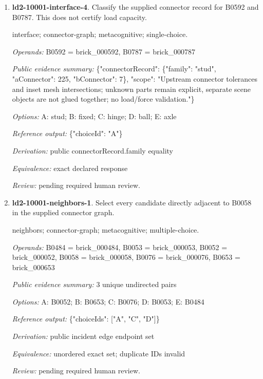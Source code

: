 \begin{enumerate}
\par{\small interface; connector-graph; metacognitive; single-choice.\par\textit{Operands:} B0845 = brick\_000845, B0840 = brick\_000840\par\textit{Public evidence summary:} \{"connectorRecord": \{"family": "hinge", "aConnector": 0, "bConnector": 6\}, "scope": "Upstream connector tolerances and inset mesh intersections; unknown parts remain explicit, separate scene objects are not glued together; no load/force validation."\}\par\textit{Options:} A: stud; B: hinge; C: fixed; D: ball; E: axle\par\textit{Reference output:} \{"choiceId": "B"\}\par\textit{Derivation:} public connectorRecord.family equality\par\textit{Equivalence:} exact declared response\par\textit{Review:} pending required human review.}
\item \textbf{ld2-10001-interface-4}. Classify the supplied connector record for B0592 and B0787. This does not certify load capacity.
\par{\small interface; connector-graph; metacognitive; single-choice.\par\textit{Operands:} B0592 = brick\_000592, B0787 = brick\_000787\par\textit{Public evidence summary:} \{"connectorRecord": \{"family": "stud", "aConnector": 225, "bConnector": 7\}, "scope": "Upstream connector tolerances and inset mesh intersections; unknown parts remain explicit, separate scene objects are not glued together; no load/force validation."\}\par\textit{Options:} A: stud; B: fixed; C: hinge; D: ball; E: axle\par\textit{Reference output:} \{"choiceId": "A"\}\par\textit{Derivation:} public connectorRecord.family equality\par\textit{Equivalence:} exact declared response\par\textit{Review:} pending required human review.}
\item \textbf{ld2-10001-neighbors-1}. Select every candidate directly adjacent to B0058 in the supplied connector graph.
\par{\small neighbors; connector-graph; metacognitive; multiple-choice.\par\textit{Operands:} B0484 = brick\_000484, B0053 = brick\_000053, B0052 = brick\_000052, B0058 = brick\_000058, B0076 = brick\_000076, B0653 = brick\_000653\par\textit{Public evidence summary:} 3 unique undirected pairs\par\textit{Options:} A: B0052; B: B0653; C: B0076; D: B0053; E: B0484\par\textit{Reference output:} \{"choiceIds": ["A", "C", "D"]\}\par\textit{Derivation:} public incident edge endpoint set\par\textit{Equivalence:} unordered exact set; duplicate IDs invalid\par\textit{Review:} pending required human review.}

\end{enumerate}
